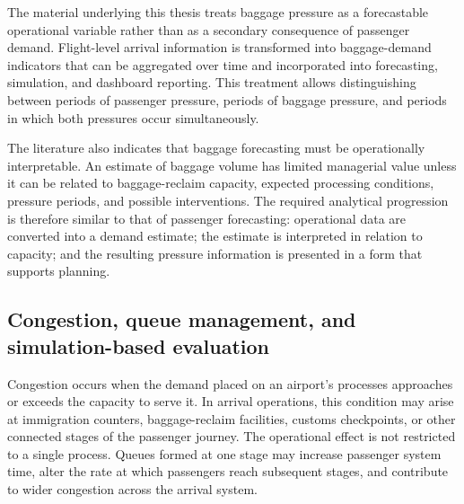 The material underlying this thesis treats baggage pressure as a forecastable operational variable rather than as a secondary consequence of passenger demand. Flight-level arrival information is transformed into baggage-demand indicators that can be aggregated over time and incorporated into forecasting, simulation, and dashboard reporting. This treatment allows distinguishing between periods of passenger pressure, periods of baggage pressure, and periods in which both pressures occur simultaneously.

The literature also indicates that baggage forecasting must be operationally interpretable. An estimate of baggage volume has limited managerial value unless it can be related to baggage-reclaim capacity, expected processing conditions, pressure periods, and possible interventions. The required analytical progression is therefore similar to that of passenger forecasting: operational data are converted into a demand estimate; the estimate is interpreted in relation to capacity; and the resulting pressure information is presented in a form that supports planning.

\subsection{Congestion, queue management, and simulation-based evaluation}
\label{subsec:congestion-queue-simulation}

Congestion occurs when the demand placed on an airport's processes approaches or exceeds the capacity to serve it. In arrival operations, this condition may arise at immigration counters, baggage-reclaim facilities, customs checkpoints, or other connected stages of the passenger journey. The operational effect is not restricted to a single process. Queues formed at one stage may increase passenger system time, alter the rate at which passengers reach subsequent stages, and contribute to wider congestion across the arrival system.

